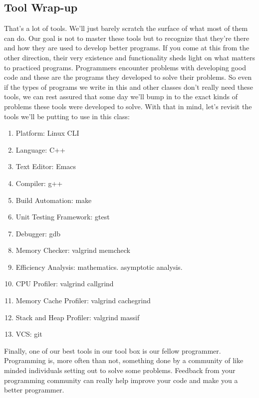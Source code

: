 \documentclass[]{tufte-handout}
\begin{document}
\subsection{Tool Wrap-up}

That's a lot of tools.  We'll just barely scratch the surface of what most of them can do.  Our goal is not to master these tools but to recognize that they're there and how they are used to develop better programs. If you come at this from the other direction, their very existence and functionality sheds light on what matters to practiced programs.  Programmers encounter problems with developing good code and these are the programs they developed to solve their problems.  So even if the types of programs we write in this and other classes don't really need these tools, we can rest assured that some day we'll bump in to the exact kinds of problems these tools were developed to solve. With that in mind, let's revisit the tools we'll be putting to use in this class:
\begin{enumerate}
\item Platform: Linux CLI
\item Language: C++
\item Text Editor: Emacs
\item Compiler: g++
\item Build Automation: make
\item Unit Testing Framework: gtest
\item Debugger: gdb
\item Memory Checker: valgrind memcheck
\item Efficiency Analysis: mathematics. asymptotic analysis. 
\item CPU Profiler: valgrind callgrind
\item Memory Cache Profiler: valgrind cachegrind
\item Stack and Heap Profiler: valgrind massif
\item VCS: git
\end{enumerate}   
Finally, one of our best tools in our tool box is our fellow programmer. Programming is, more often than not, something done by a community of like minded individuals setting out to solve some problems. Feedback from your programming community can really help improve your code and make you a better programmer.  
\end{document}
